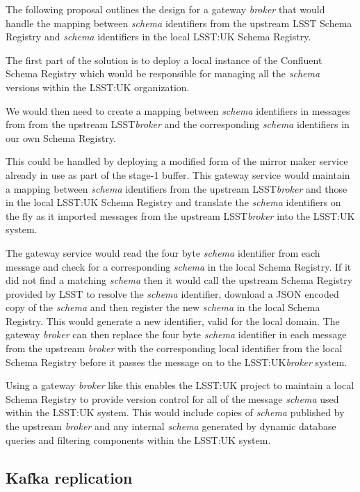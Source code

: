 \documentclass{article}
\newcommand{\json} {JSON\xspace}
\newcommand{\kfbroker} {\textit{broker}\xspace}
\newcommand{\confluent} {Confluent\xspace}
\newcommand{\avschema} {\textit{schema}\xspace}
\newcommand{\conschemaregistry} {Schema Registry\xspace}
\newcommand{\stageone} {stage-1\xspace}
\newcommand{\lsst} {LSST\xspace}
\newcommand{\lsstuk} {LSST:UK\xspace}
\begin{document}
The following proposal outlines the design for a gateway \kfbroker that would handle the mapping between \avschema identifiers from the upstream \lsst \conschemaregistry and \avschema identifiers in the local \lsstuk \conschemaregistry.

The first part of the solution is to deploy a local instance of the \confluent \conschemaregistry which would be responsible for managing all the \avschema versions within the \lsstuk organization.

We would then need to create a mapping between \avschema identifiers in messages from from the upstream \lsst \kfbroker and the corresponding \avschema identifiers in our own \conschemaregistry.

This could be handled by deploying a modified form of the mirror maker service already in use as part of the \stageone buffer.
This gateway service would maintain a mapping between \avschema identifiers from the upstream \lsst \kfbroker and those in the local \lsstuk \conschemaregistry and translate the \avschema identifiers on the fly as it imported messages from the upstream \lsst \kfbroker into the \lsstuk system.

The gateway service would read the four byte \avschema identifier from each message and check for a corresponding \avschema in the local \conschemaregistry. If it did not find a matching \avschema then it would call the upstream \conschemaregistry provided by \lsst to resolve the \avschema identifier, download a \json encoded copy of the \avschema and then register the new \avschema in the local \conschemaregistry. This would generate a new identifier, valid for the local domain.
The gateway \kfbroker can then replace the four byte \avschema identifier in each message from the upstream \kfbroker with the corresponding local identifier from the local \conschemaregistry before it passes the message on to the \lsstuk \kfbroker system.

Using a gateway \kfbroker like this enables the \lsstuk project to maintain a local \conschemaregistry to provide version control for all of the message \avschema used within the \lsstuk system. This would include copies of \avschema published by the upstream \kfbroker and any internal \avschema generated by dynamic database queries and filtering components within the \lsstuk system.

\subsection{Kafka replication}
\label{kafka-data-storage}
\end{document}
